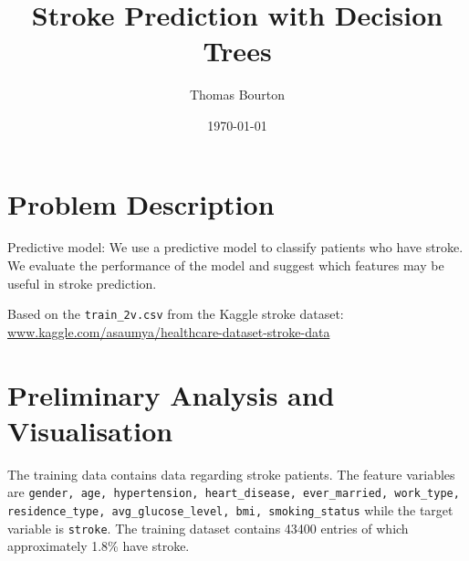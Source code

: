 \documentclass[10pt]{article}
\title{Stroke Prediction with Decision Trees}
\date{\today}
\author{Thomas Bourton}
\begin{document}
\maketitle 
\section{Problem Description}
Predictive model: We use a predictive model to classify patients who have
stroke. We evaluate the performance of the model and suggest which features may be
useful in stroke prediction.

Based on the \texttt{​train\_2v.csv} from the Kaggle stroke dataset: \href{https://www.kaggle.com/asaumya/healthcare-dataset-stroke-data}{www.kaggle.com/asaumya/healthcare-dataset-stroke-data}
​

\section{Preliminary Analysis and Visualisation}
The training data contains data regarding stroke patients. The feature variables are \texttt{gender, age, hypertension, heart\_disease, ever\_married, work\_type, residence\_type, avg\_glucose\_level, bmi, smoking\_status} while the target variable is \texttt{stroke}. The training dataset contains 43400 entries of which approximately 1.8\% have stroke. 
\end{document}
